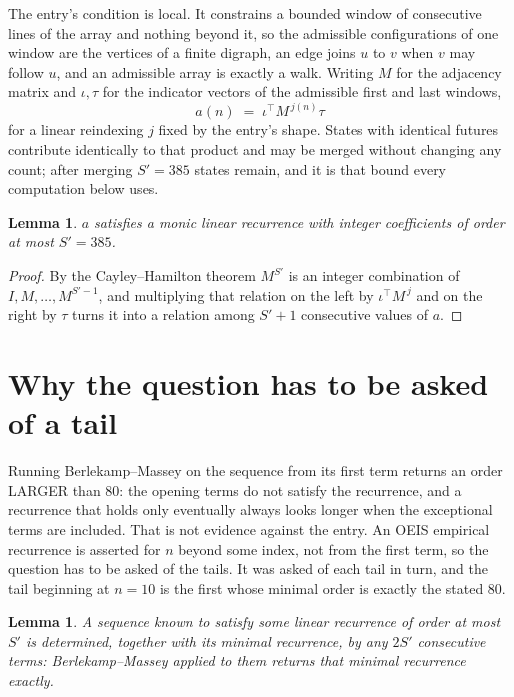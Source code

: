 \documentclass[11pt,a4paper]{article}
\theoremstyle{plain}
\newtheorem{lemma}[theorem]{Lemma}
\theoremstyle{definition}
\begin{document}
The entry's condition is local. It constrains a bounded window of consecutive lines of the
array and nothing beyond it, so the admissible configurations of one window are the vertices of
a finite digraph, an edge joins $u$ to $v$ when $v$ may follow $u$, and an admissible array is
exactly a walk. Writing $M$ for the adjacency matrix and $\iota,\tau$ for the indicator vectors
of the admissible first and last windows,
\[
a(n)\;=\;\iota^{\!\top}M^{\,j(n)}\tau
\]
for a linear reindexing $j$ fixed by the entry's shape. States with identical futures
contribute identically to that product and may be merged without changing any count; after
merging $S'=385$ states remain, and it is that bound every computation below uses.

\begin{lemma}\label{lem:cf}
$a$ satisfies a monic linear recurrence with integer coefficients of order at most $S'=385$.
\end{lemma}

\begin{proof}
By the Cayley--Hamilton theorem $M^{S'}$ is an integer combination of $I,M,\dots,M^{S'-1}$,
and multiplying that relation on the left by $\iota^{\!\top}M^{\,j}$ and on the right by
$\tau$ turns it into a relation among $S'+1$ consecutive values of $a$.
\end{proof}

\section{Why the question has to be asked of a tail}

Running Berlekamp--Massey on the sequence from its first term returns an order LARGER than $80$: the opening terms do not satisfy the recurrence, and a recurrence that holds only eventually always looks longer when the exceptional terms are included. That is not evidence against the entry. An OEIS empirical recurrence is asserted for $n$ beyond some index, not from the first term, so the question has to be asked of the tails. It was asked of each tail in turn, and the tail beginning at $n=10$ is the first whose minimal order is exactly the stated $80$.

\begin{lemma}\label{lem:bm}
A sequence known to satisfy some linear recurrence of order at most $S'$ is determined,
together with its minimal recurrence, by any $2S'$ consecutive terms: Berlekamp--Massey applied
to them returns that minimal recurrence exactly.
\end{lemma}
\end{document}
